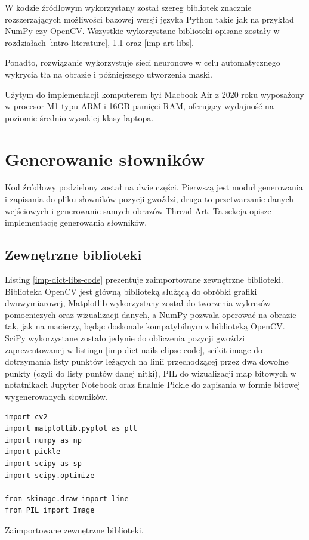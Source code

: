 \documentclass[a4paper, 12pt, polish, twoside]{extreport}
\begin{document}
    W kodzie źródłowym wykorzystany został szereg bibliotek znacznie rozszerzających możliwości bazowej wersji języka Python takie jak na przykład NumPy czy OpenCV. Wszystkie wykorzystane biblioteki opisane zostały w rozdziałach \ref{intro-literature}, \ref{imp-dict-libs} oraz \ref{imp-art-libs}.
    
    Ponadto, rozwiązanie wykorzystuje sieci neuronowe w celu automatycznego wykrycia tła na obrazie i późniejszego utworzenia maski.
    
    Użytym do implementacji komputerem był Macbook Air z 2020 roku wyposażony w procesor M1 typu ARM i 16GB pamięci RAM, oferujący wydajność na poziomie średnio-wysokiej klasy laptopa.
    
    \section{Generowanie słowników} \label{imp-dict}
    Kod źródłowy podzielony został na dwie części. Pierwszą jest moduł generowania i zapisania do pliku słowników pozycji gwoździ, druga to przetwarzanie danych wejściowych i generowanie samych obrazów Thread Art. Ta sekcja opisze implementację generowania słowników.
    
        \subsection{Zewnętrzne biblioteki} \label{imp-dict-libs}
        Listing \ref{imp-dict-libs-code} prezentuje zaimportowane zewnętrzne biblioteki. Biblioteka OpenCV jest główną biblioteką służącą do obróbki grafiki dwuwymiarowej, Matplotlib wykorzystany został do tworzenia wykresów pomocniczych oraz wizualizacji danych, a NumPy pozwala operować na obrazie tak, jak na macierzy, będąc doskonale kompatybilnym z biblioteką OpenCV. SciPy wykorzystane zostało jedynie do obliczenia pozycji gwoździ zaprezentowanej w listingu \ref{imp-dict-nails-elipse-code}, scikit-image do dotrzymania listy punktów leżących na linii przechodzącej przez dwa dowolne punkty (czyli do listy puntów danej nitki), PIL do wizualizacji map bitowych w notatnikach Jupyter Notebook oraz finalnie Pickle do zapisania w formie bitowej wygenerowanych słowników.
        \begin{code}[H]
        \begin{verbatim}
import cv2
import matplotlib.pyplot as plt
import numpy as np
import pickle
import scipy as sp
import scipy.optimize

from skimage.draw import line
from PIL import Image
        \end{verbatim}
        \caption{Zaimportowane zewnętrzne biblioteki.}
        \label{imp-dict-libs-code}
        \end{code}
        
\end{document}
